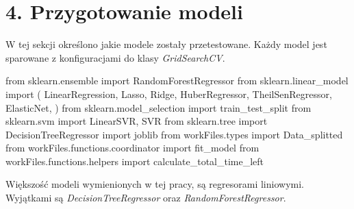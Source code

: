 {}
\justify
\fontsize{14}{16}\selectfont
\setlength{\parindent}{0pt}
\section*{4. Przygotowanie modeli} 
\fontsize{12}{14}\selectfont

\hspace{1.5cm} W tej sekcji określono jakie modele zostały przetestowane. Każdy model jest sparowane z konfiguracjami do klasy \textit{GridSearchCV}.



\begin{pythoncode}
from sklearn.ensemble import RandomForestRegressor
from sklearn.linear_model import (
    LinearRegression,
    Lasso,
    Ridge,
    HuberRegressor,
    TheilSenRegressor,
    ElasticNet,
)
from sklearn.model_selection import train_test_split
from sklearn.svm import LinearSVR, SVR
from sklearn.tree import DecisionTreeRegressor
import joblib
from workFiles.types import Data_splitted
from workFiles.functions.coordinator import fit_model
from workFiles.functions.helpers import calculate_total_time_left
\end{pythoncode}




\hspace{1.5cm} Większość modeli wymienionych w tej pracy, są regresorami liniowymi. Wyjątkami są \textit{DecisionTreeRegressor} oraz \textit{RandomForestRegressor}.

